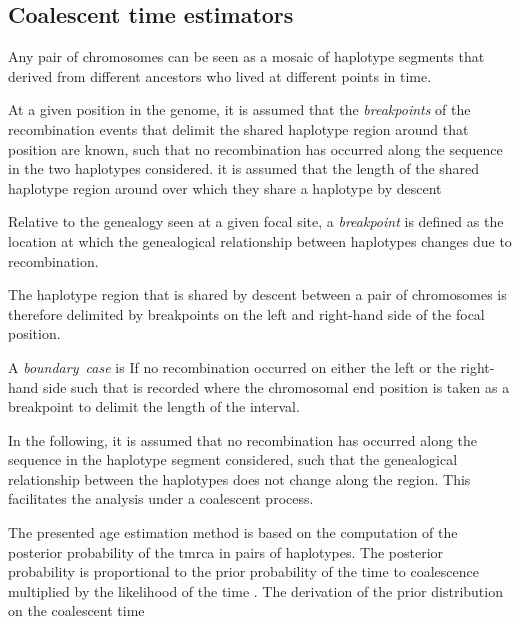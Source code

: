 

%
\subsection{Coalescent time estimators}\label{sec:tmrca_clocks}
%


Any pair of chromosomes can be seen as a mosaic of haplotype segments that derived from different ancestors who lived at different points in time.

At a given position in the genome, it is assumed that the \emph{breakpoints} of the recombination events that delimit the shared haplotype region around that position are known, such that no recombination has occurred along the sequence in the two haplotypes considered.
it is assumed that the length of the shared haplotype region around
over which they share a haplotype by descent

Relative to the genealogy seen at a given focal site, a \emph{breakpoint} is defined as the location at which the genealogical relationship between  haplotypes changes due to recombination.

The haplotype region that is shared by descent between a pair of chromosomes is therefore delimited by  breakpoints on the left and right-hand side of the focal position.

A \emph{boundary~case} is
If no recombination occurred on either the left or the right-hand side
such that
is recorded where the chromosomal end position is taken as a breakpoint to delimit the length of the interval.


In the following, it is assumed that no recombination has occurred along the sequence in the haplotype segment considered, such that the genealogical relationship between the  haplotypes does not change along the region.
This facilitates the analysis under a coalescent process.


The presented age estimation method is based on the computation of the posterior probability of the \gls{tmrca} in pairs of haplotypes.
The posterior probability is proportional to the prior probability of the time to coalescence multiplied by the likelihood of the time .
The derivation of the prior distribution on the coalescent time 

